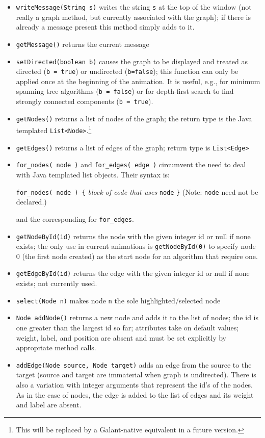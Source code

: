 \begin{itemize}

\item
  \texttt{writeMessage(String s)}
  writes the string \texttt{s} at the top of the window (not really a graph method, but currently associated with the graph); if there is already a message present this method simply adds to it.
\item
  \texttt{getMessage()}
  returns the current message
\item
  \texttt{setDirected(boolean b)}
  causes the graph to be displayed and treated as directed (\texttt{b =
    true}) or undirected (\texttt{b=false}); this function can only be
  applied once at the beginning of the animation. It is useful, e.g., for
  minimum spanning tree algorithms (\texttt{b = false}) or for depth-first
  search to find strongly connected components (\texttt{b = true}).
\item
  \texttt{getNodes()}
  returns a list of nodes of the graph; the return type is the Java
templated \texttt{List<Node>}.\footnote{This will be replaced by a Galant-native
equivalent in a future version.}
\item
  \texttt{getEdges()}
  returns a list of edges of the graph; return type is \texttt{List<Edge>}
\item
  \verb+for_nodes( node )+ and \verb+for_edges( edge )+ circumvent the need to deal with Java templated list objects.
  Their syntax is:

    \verb+for_nodes( node ) {+ \emph{block of code that uses} \texttt{node} \verb+}+ (Note: \texttt{node} need not be declared.)

    and the corresponding for \verb+for_edges+.
\item
  \texttt{getNodeById(id)}
  returns the node with the given integer id or null if none exists; the only
  use in current animations is \texttt{getNodeById(0)} to specify node 0 (the first node
  created) as the start node for an algorithm that require one.
\item
  \texttt{getEdgeById(id)}
  returns the edge with the given integer id or null if none exists; not currently used.
\item
  \texttt{select(Node n)}
  makes node \texttt{n} the sole highlighted/selected node
\item
  \texttt{Node addNode()}
  returns a new node and adds it to the list of nodes; the id is one greater than the largest id so far;
attributes take on default values; weight, label, and position are absent and must be set explicitly
by appropriate method calls.
\item
  \texttt{addEdge(Node source, Node target)} adds an edge from the source to
  the target (source and target are immaterial when graph is undirected).
  There is also a variation with integer arguments that represent the id's of the nodes. As in the case of nodes, the edge is added to the list of edges and
its weight and label are absent.
\end{itemize}

